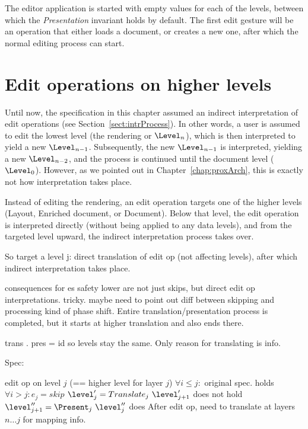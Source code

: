 The editor application is started with empty values for each of the levels, between which the {\em Presentation} invariant holds by default. The first edit gesture will be an operation that either loads a document, or creates a new one, after which the normal editing process can start.


%																
%																
%																
\section{Edit operations  on higher levels} \label{sect:specHigherEdit}

Until now, the specification in this chapter assumed an indirect interpretation of edit operations (see Section~\ref{sect:intrProcess}). In other words, a user is assumed to edit the lowest level (the rendering or $\Level_n$), which is then interpreted to yield a new $\Level_{n-1}$. Subsequently, the new $\Level_{n-1}$ is interpreted, yielding a new $\Level_{n-2}$, and the process is continued until the document level ($\Level_0$). However, as we pointed out in Chapter~\ref{chap:proxArch}, this is exactly not how interpretation takes place.

\toHere     %

Instead of editing the rendering, an edit operation targets one of the higher levels (Layout, Enriched document, or Document). Below that level, the edit operation is interpreted directly (without being applied to any data levels), and from the targeted level upward, the indirect interpretation process takes over.

So target a level j: direct translation of edit op (not affecting levels), after which indirect interpretation takes place.

\bl
\* consequences for es safety
\* lower are not just skips, but direct edit op interpretations.
\* tricky. maybe need to point out diff between skipping and processing
\* kind of phase shift. Entire translation/presentation process is completed, but it starts at higher translation and also ends there.
\el

\bl
\* trans . pres = id so levels stay the same. Only reason for translating is info.
\el

Spec:

\bl
\* edit op on level $j$ (== higher level for layer $j$)
\* $\forall i\le j:$ original spec. holds
\* $\forall i>j: e_j = skip$ 
\* $\level'_j = Translate_j~\level'_{j+1}$ does not hold $\level''_{j+1} = \Present_j~\level''_j$ does
\* After edit op, need to translate at layers $n\dots j$ for mapping info.
\el 

